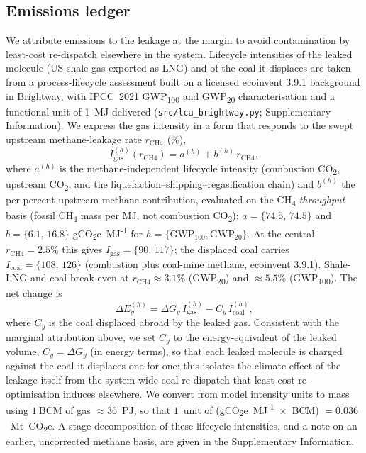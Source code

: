 \documentclass[sn-nature]{sn-jnl}
\theoremstyle{thmstyleone}%
\theoremstyle{thmstyletwo}%
\theoremstyle{thmstylethree}%
\begin{document}
\subsection*{Emissions ledger}
We attribute emissions to the leakage at the margin to avoid contamination
by least-cost re-dispatch elsewhere in the system. Lifecycle intensities of
the leaked molecule (US shale gas exported as LNG) and of the coal it displaces
are taken from a process-lifecycle assessment built on a licensed ecoinvent
3.9.1 background in Brightway, with IPCC~2021 GWP\textsubscript{100} and
GWP\textsubscript{20} characterisation and a functional unit of 1~MJ delivered
(\texttt{src/lca\_brightway.py}; Supplementary Information). We express the gas
intensity in a form that responds to the swept upstream methane-leakage rate
$r_{\mathrm{CH4}}$ (\%),
\begin{equation}
I_{\mathrm{gas}}^{(h)}(r_{\mathrm{CH4}}) = a^{(h)} + b^{(h)}\, r_{\mathrm{CH4}},
\end{equation}
where $a^{(h)}$ is the methane-independent lifecycle intensity (combustion
CO\textsubscript{2}, upstream CO\textsubscript{2}, and the
liquefaction--shipping--regasification chain) and $b^{(h)}$ the per-percent
upstream-methane contribution, evaluated on the CH\textsubscript{4}
\emph{throughput} basis (fossil CH\textsubscript{4} mass per MJ, not combustion
CO\textsubscript{2}): $a=\{74.5,\,74.5\}$ and $b=\{6.1,\,16.8\}$
gCO\textsubscript{2}e~MJ\textsuperscript{-1} for
$h=\{\mathrm{GWP}_{100},\mathrm{GWP}_{20}\}$. At the central
$r_{\mathrm{CH4}}=2.5\%$ this gives
$I_{\mathrm{gas}}=\{90,\,117\}$; the displaced coal carries
$I_{\mathrm{coal}}=\{108,\,126\}$ (combustion plus coal-mine methane, ecoinvent
3.9.1). Shale-LNG and coal break even at $r_{\mathrm{CH4}}\approx3.1\%$
(GWP\textsubscript{20}) and $\approx5.5\%$ (GWP\textsubscript{100}). The net
change is
\begin{equation}
\Delta E^{(h)}_y = \Delta G_y\, I_{\mathrm{gas}}^{(h)}
                 - C_y\, I_{\mathrm{coal}}^{(h)},
\end{equation}
where $C_y$ is the coal displaced abroad by the leaked gas. Consistent with the
marginal attribution above, we set $C_y$ to the energy-equivalent of the leaked
volume, $C_y = \Delta G_y$ (in energy terms), so that each leaked molecule is
charged against the coal it displaces one-for-one; this isolates the climate
effect of the leakage itself from the system-wide coal re-dispatch that
least-cost re-optimisation induces elsewhere. We convert from model intensity
units to mass using $1~\mathrm{BCM}$ of gas $\approx 36$~PJ, so that $1$~unit
of (gCO\textsubscript{2}e~MJ\textsuperscript{-1}~$\times$~BCM)
$=0.036$~Mt~CO\textsubscript{2}e. A stage decomposition of these lifecycle
intensities, and a note on an earlier, uncorrected methane basis, are given
in the Supplementary Information.
\end{document}
